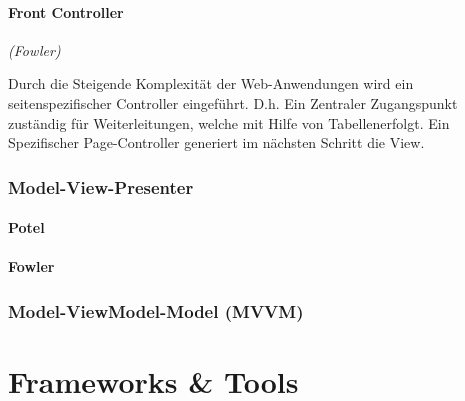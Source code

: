 \documentclass[8pt,a4paper,landscape]{extarticle}
\begin{document}
\begin{multicols*}{4}
	\paragraph{Front Controller} \emph{(Fowler)} \par
	Durch die Steigende Komplexität der Web-Anwendungen wird ein
	seitenspezifischer Controller eingeführt. D.h. Ein Zentraler Zugangspunkt
	zuständig für Weiterleitungen, welche mit Hilfe von Tabellenerfolgt. Ein
	Spezifischer Page-Controller generiert im nächsten Schritt die View.
	\subsubsection{Model-View-Presenter}
	\paragraph{Potel}
	\paragraph{Fowler}
	\subsubsection{Model-ViewModel-Model (MVVM)}
	\section{Frameworks \& Tools}
\end{multicols*}
\end{document}
